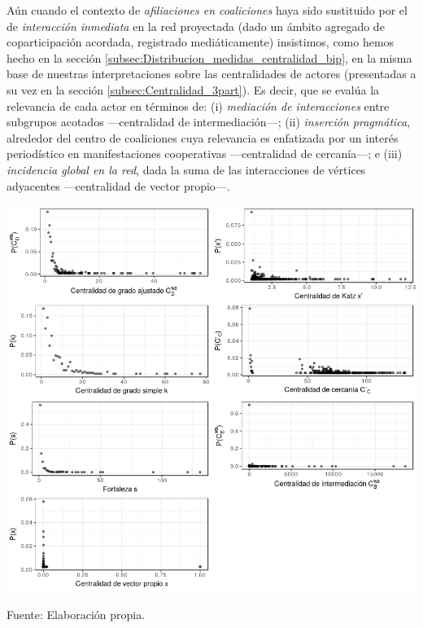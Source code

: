 \documentclass[letterpaper, 11pt]{book}
\theoremstyle{definition}
\theoremstyle{remark}
\begin{document}
Aún cuando el contexto de \emph{afiliaciones en coaliciones} haya sido sustituido por el de \emph{interacción inmediata} en la red proyectada (dado un ámbito agregado de coparticipación acordada, registrado mediáticamente) insistimos, como hemos hecho en la sección \ref{subsec:Distribucion_medidas_centralidad_bip}, en la misma base de nuestras interpretaciones sobre las centralidades de actores (presentadas a su vez en la sección \ref{subsec:Centralidad_3part}). 
Es decir, que se evalúa la relevancia de cada actor en términos de: 
(i) \emph{mediación de interacciones} entre subgrupos acotados ---centralidad de intermediación---; 
(ii) \emph{inserción pragmática}, alrededor del centro de coaliciones cuya relevancia es enfatizada por un interés periodístico en manifestaciones cooperativas ---centralidad de cercanía---; 
e (iii) \emph{incidencia global en la red}, dada la suma de las interacciones de vértices adyacentes ---centralidad de vector propio---. 



\hspace{-1em}\begin{minipage}{\linewidth}
\centering
{} \label{5.7_centralidadesProyec}
\hspace{-1em}\includegraphics[scale=0.63]{img/5.7_centralidadesProyec.png}
\par\bigskip
\small Fuente: Elaboración propia. 
\end{minipage}\bigskip
\end{document}
